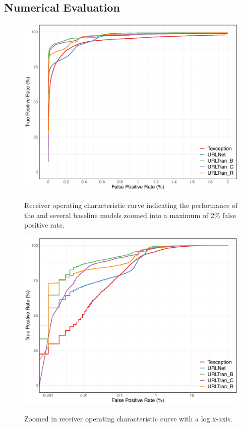 \subsection{Numerical Evaluation}


\begin{figure}
    \centering
	\includegraphics[width=0.7\linewidth,alt={ROC curev indicating impromvents of our model over baseline models upto a maximum of 2\% FPR}]{urltran/figures/roc_0_02_R.png}
	\caption{Receiver operating characteristic curve indicating the performance of the \URLTranSys and several baseline models zoomed into a maximum of 2\% false positive rate.}
	\label{fig:urltran:transformer2}
\end{figure}

\begin{figure}
    \centering
	\includegraphics[width=0.7\linewidth,alt={Zoomed in full ROC curve with a log x-axis.}]{urltran/figures/log_roc_R.png}
	\caption{Zoomed in receiver operating characteristic curve with a log x-axis.}
	\label{fig:urltran:log_transformer2}
\end{figure}



